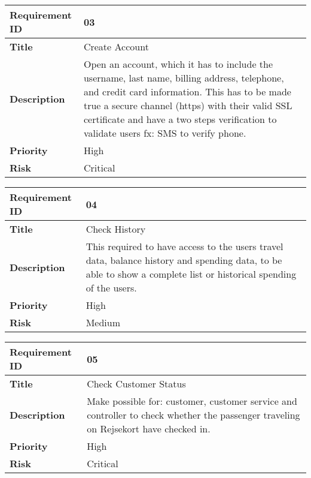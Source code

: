 \begin{center}
	\def\arraystretch{1.5}%
    \begin{tabular}{ | p{5cm} | p{5cm} |}
    \hline
    	\textbf{Requirement ID} & 03 \\ \hline
		\textbf{Title} & Create Account\\ \hline
		\textbf{Description} & Open an account, which it has to include the username, last name, billing address, telephone, and credit card information. This has to be made true a secure channel (https) with their valid SSL certificate and have a two steps verification to validate users fx: SMS to verify phone.\\ \hline
		\textbf{Priority} & High\\ \hline
		\textbf{Risk} & Critical\\
      \hline
    \end{tabular}
\end{center}

\begin{center}
	\def\arraystretch{1.5}%
    \begin{tabular}{ | p{5cm} | p{5cm} |}
    \hline
    	\textbf{Requirement ID} & 04 \\ \hline
		\textbf{Title} & Check History\\ \hline
		\textbf{Description} & This required to have access to the users travel data, balance history and spending data, to be able to show a complete list or historical spending of the users.\\ \hline
		\textbf{Priority} & High\\ \hline
		\textbf{Risk} & Medium\\
      \hline
    \end{tabular}
\end{center}

\begin{center}
	\def\arraystretch{1.5}%
    \begin{tabular}{ | p{5cm} | p{5cm} |}
    \hline
    	\textbf{Requirement ID} & 05 \\ \hline
		\textbf{Title} & Check Customer Status\\ \hline
		\textbf{Description} & Make possible for: customer, customer service and controller to check whether the passenger traveling on Rejsekort have checked in.\\ \hline
		\textbf{Priority} & High\\ \hline
		\textbf{Risk} & Critical\\
      \hline
    \end{tabular}
\end{center}

